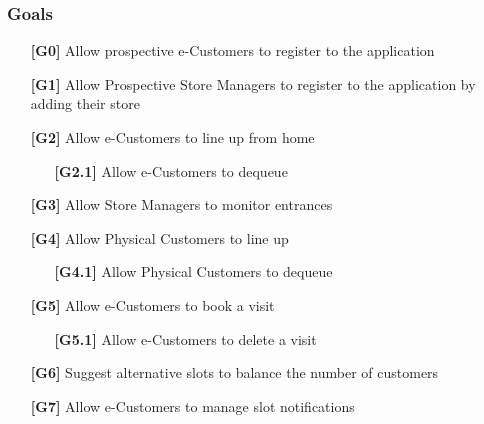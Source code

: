 \subsubsection{Goals}
\begin{itemize}[itemsep=-1mm, topsep=-1mm]
	\item [\textbf{[G0]}] Allow prospective e-Customers to register to the application
	\item [\textbf{[G1]}] Allow Prospective Store Managers to register to the application by adding their store
	\item [\textbf{[G2]}] Allow e-Customers to line up from home
	\begin{itemize}[itemsep=-1mm, topsep=-1mm]\item [\textbf{[G2.1]}] Allow e-Customers to dequeue\end{itemize}
	\item [\textbf{[G3]}] Allow Store Managers to monitor entrances
	\item [\textbf{[G4]}] Allow Physical Customers to line up
	\begin{itemize}[itemsep=-1mm, topsep=-1mm]\item [\textbf{[G4.1]}] Allow Physical Customers to dequeue\end{itemize}
	\item [\textbf{[G5]}] Allow e-Customers to book a visit
	\begin{itemize}[itemsep=-1mm, topsep=-1mm]\item [\textbf{[G5.1]}] Allow e-Customers to delete a visit\end{itemize}
	\item [\textbf{[G6]}] Suggest alternative slots to balance the number of customers
	\item [\textbf{[G7]}] Allow e-Customers to manage slot notifications
\end{itemize}